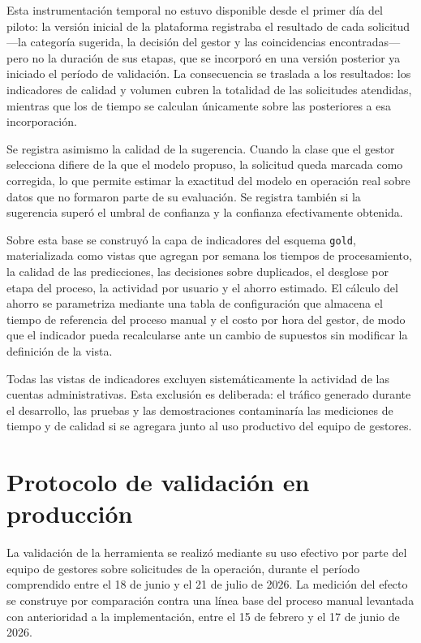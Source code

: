 Esta instrumentación temporal no estuvo disponible desde el primer día del piloto: la versión inicial de la plataforma registraba el resultado de cada solicitud —la categoría sugerida, la decisión del gestor y las coincidencias encontradas— pero no la duración de sus etapas, que se incorporó en una versión posterior ya iniciado el período de validación. La consecuencia se traslada a los resultados: los indicadores de calidad y volumen cubren la totalidad de las solicitudes atendidas, mientras que los de tiempo se calculan únicamente sobre las posteriores a esa incorporación.

Se registra asimismo la calidad de la sugerencia. Cuando la clase que el gestor selecciona difiere de la que el modelo propuso, la solicitud queda marcada como corregida, lo que permite estimar la exactitud del modelo en operación real sobre datos que no formaron parte de su evaluación. Se registra también si la sugerencia superó el umbral de confianza y la confianza efectivamente obtenida.

Sobre esta base se construyó la capa de indicadores del esquema \texttt{gold}, materializada como vistas que agregan por semana los tiempos de procesamiento, la calidad de las predicciones, las decisiones sobre duplicados, el desglose por etapa del proceso, la actividad por usuario y el ahorro estimado. El cálculo del ahorro se parametriza mediante una tabla de configuración que almacena el tiempo de referencia del proceso manual y el costo por hora del gestor, de modo que el indicador pueda recalcularse ante un cambio de supuestos sin modificar la definición de la vista.

Todas las vistas de indicadores excluyen sistemáticamente la actividad de las cuentas administrativas. Esta exclusión es deliberada: el tráfico generado durante el desarrollo, las pruebas y las demostraciones contaminaría las mediciones de tiempo y de calidad si se agregara junto al uso productivo del equipo de gestores.

\section{Protocolo de validación en producción}
La validación de la herramienta se realizó mediante su uso efectivo por parte del equipo de gestores sobre solicitudes de la operación, durante el período comprendido entre el 18 de junio y el 21 de julio de 2026. La medición del efecto se construye por comparación contra una línea base del proceso manual levantada con anterioridad a la implementación, entre el 15 de febrero y el 17 de junio de 2026.

